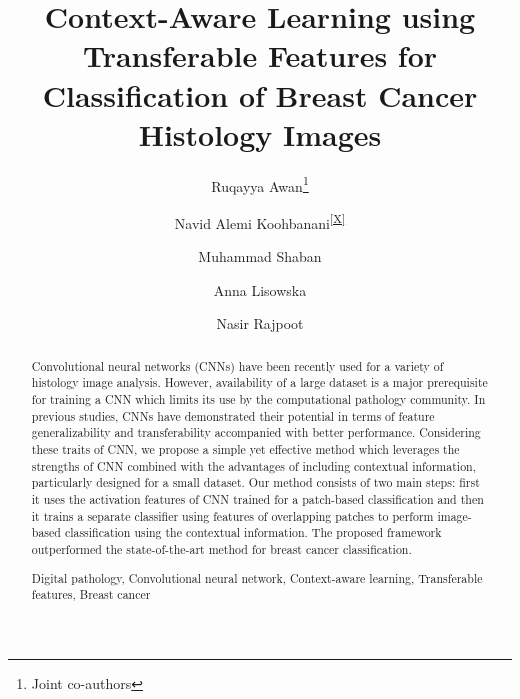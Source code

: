 \documentclass[runningheads,a4paper]{llncs}
\newcommand{\repthanks}[1]{\textsuperscript{\ref{#1}}}
\newcommand{\keywords}[1]{\par\addvspace\baselineskip
\noindent\keywordname\enspace\ignorespaces#1}
\begin{document}
\mainmatter  %

\title{Context-Aware Learning using Transferable Features for Classification of Breast Cancer Histology Images}

\author[1]{Ruqayya Awan\thanks{Joint co-authors\protect\label{X}}}
\author[1,2]{Navid Alemi Koohbanani\repthanks{X}}
\author[1]{Muhammad Shaban}
\author[1]{Anna Lisowska}
\author[1,2,3]{Nasir Rajpoot}



\institute{}

%
%


%
%

\maketitle


\begin{abstract}
Convolutional neural networks (CNNs) have been recently used for a variety of histology image analysis. However, availability of a large dataset is a major prerequisite for training a CNN which limits its use by the computational pathology community. In previous studies, CNNs have demonstrated their potential in terms of feature generalizability and transferability accompanied with better performance. Considering these traits of CNN, we propose a simple yet effective method which leverages the strengths of CNN combined with the advantages of including contextual information, particularly designed for a small dataset. Our method consists of two main steps: first it uses the activation features of CNN trained for a patch-based classification and then it trains a separate classifier using features of overlapping patches to perform image-based classification using the contextual information. The proposed framework outperformed the state-of-the-art method for breast cancer classification.

\keywords{Digital pathology, Convolutional neural network, Context-aware learning, Transferable features, Breast cancer}
\end{abstract}
\end{document}
